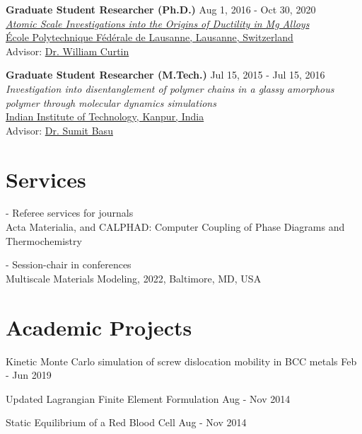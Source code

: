 \documentclass[margin,line]{resume}
\begin{document}
\begin{resume}
    \textbf{\textsf{Graduate Student Researcher (Ph.D.)}}    \hfill  \small{Aug 1, 2016 - Oct 30, 2020} \\
    \href{https://infoscience.epfl.ch/record/280981}{\textit{Atomic Scale Investigations into the Origins of Ductility in Mg Alloys}}\\
    \href{https://www.epfl.ch/en/}{\'Ecole Polytechnique F\'ed\'erale de Lausanne, Lausanne, Switzerland}\\
    Advisor:  \href{https://people.epfl.ch//william.curtin?lang=en}{Dr. William Curtin}


    \textbf{\textsf{Graduate Student Researcher (M.Tech.)}} \hfill \small{Jul 15, 2015 - Jul 15, 2016} \\
    \textit{Investigation into disentanglement of polymer chains in a glassy amorphous polymer through molecular dynamics simulations}   \\
    \href{http://www.iitk.ac.in/}{Indian Institute of Technology, Kanpur, India}\\
    Advisor: \href{http://home.iitk.ac.in/~sbasu/}{Dr. Sumit Basu}


    \section{\mysidestyle Services}
    - Referee services for journals \\
    \hspace*{0.5cm} Acta Materialia, and CALPHAD: Computer Coupling of Phase Diagrams and Thermochemistry

    - Session-chair in conferences \\
    \hspace*{0.5cm} Multiscale Materials Modeling, 2022, Baltimore, MD, USA

    \clearpage

    \section{\mysidestyle Academic Projects}

    Kinetic Monte Carlo simulation of screw dislocation mobility in BCC metals  \hfill \small{Feb - Jun 2019}

    \vspace{-0.3cm}
    Updated Lagrangian Finite Element Formulation  \hfill \small{Aug - Nov 2014}

    \vspace{-0.3cm}
    Static Equilibrium of a Red Blood Cell \hfill \small{Aug - Nov 2014}


\end{resume}
\end{document}
